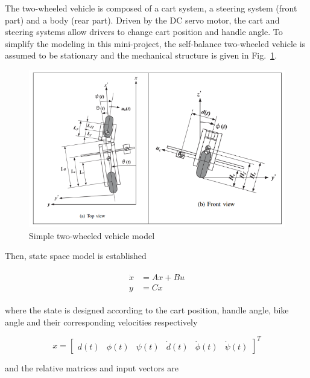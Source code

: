 \documentclass[hyperref]{article}
\theoremstyle{nonumberplain}
\begin{document}
	The two-wheeled vehicle is composed of a cart system, a steering system (front part) and a body (rear part). Driven by the DC servo motor, the cart and steering systems allow drivers to change cart position and handle angle. To simplify the modeling in this mini-project, the self-balance two-wheeled vehicle is assumed to be stationary and the mechanical structure is given in Fig.~\ref{fig2}.
	
	\begin{figure}[htbp]
		\centering
		\includegraphics[width=0.6\linewidth]{fig2.png}
		\caption{Simple two-wheeled vehicle model}
		\label{fig2}
	\end{figure} 
	
	Then, state space model is established
	
	\begin{equation}
	\begin{split}
	\begin{aligned}
		\dot{x}&=Ax+Bu \\
		y&=Cx
	\label{eq1}
	\end{aligned}
	\end{split}
	\end{equation}
	
	where the state is designed according to the cart position, handle angle, bike angle and their corresponding velocities respectively
	
	\begin{equation}
		x=\begin{bmatrix}
		d(t) & \phi(t) & \psi(t) & \dot{d}(t) & \dot{\phi}(t) & \dot{\psi}(t) 
		\end{bmatrix}^{T}
	\label{eq2}
	\end{equation}
	
	and the relative matrices and input vectors are
	
\end{document}
